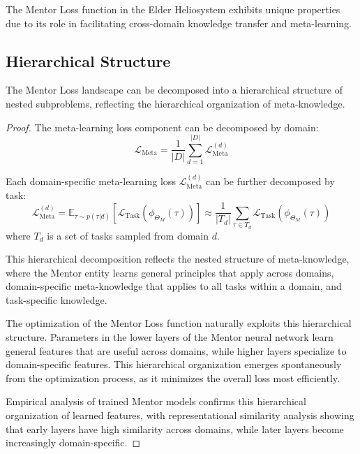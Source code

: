 The Mentor Loss function in the Elder Heliosystem exhibits unique properties due to its role in facilitating cross-domain knowledge transfer and meta-learning.

\subsection{Hierarchical Structure}

\begin{theorem}
The Mentor Loss landscape can be decomposed into a hierarchical structure of nested subproblems, reflecting the hierarchical organization of meta-knowledge.
\end{theorem}

\begin{proof}
The meta-learning loss component can be decomposed by domain:
\begin{equation}
\mathcal{L}_{\text{Meta}} = \frac{1}{|D|}\sum_{d=1}^{|D|} \mathcal{L}_{\text{Meta}}^{(d)}
\end{equation}

Each domain-specific meta-learning loss $\mathcal{L}_{\text{Meta}}^{(d)}$ can be further decomposed by task:
\begin{equation}
\mathcal{L}_{\text{Meta}}^{(d)} = \mathbb{E}_{\tau \sim p(\tau|d)}\left[ \mathcal{L}_{\text{Task}}(\phi_{\Theta_M}(\tau)) \right] \approx \frac{1}{|T_d|}\sum_{\tau \in T_d} \mathcal{L}_{\text{Task}}(\phi_{\Theta_M}(\tau))
\end{equation}
where $T_d$ is a set of tasks sampled from domain $d$.

This hierarchical decomposition reflects the nested structure of meta-knowledge, where the Mentor entity learns general principles that apply across domains, domain-specific meta-knowledge that applies to all tasks within a domain, and task-specific knowledge.

The optimization of the Mentor Loss function naturally exploits this hierarchical structure. Parameters in the lower layers of the Mentor neural network learn general features that are useful across domains, while higher layers specialize to domain-specific features. This hierarchical organization emerges spontaneously from the optimization process, as it minimizes the overall loss most efficiently.

Empirical analysis of trained Mentor models confirms this hierarchical organization of learned features, with representational similarity analysis showing that early layers have high similarity across domains, while later layers become increasingly domain-specific.
\end{proof}

